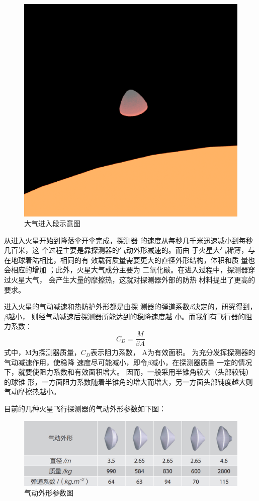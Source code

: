 \documentclass[UTF8,12pt]{ctexart}
\begin{document}
\begin{figure}[htb]
	\centering
	\includegraphics[width=0.5\linewidth]{大气进入过程.png}
	\caption{大气进入段示意图}
	\label{fig:pathdemo}	
\end{figure}
从进入火星开始到降落伞开伞完成，探测器
的速度从每秒几千米迅速减小到每秒几百米，这
个过程主要是靠探测器的气动外形减速的。而由
于火星大气稀薄，与在地球着陆相比，相同的有
效载荷质量需要更大的直径外形结构，体积和质
量也会相应的增加 ；此外，火星大气成分主要为
二氧化碳。在进入过程中，探测器穿过火星大气，
会产生大量的摩擦热，这就对探测器外部的防热
材料提出了更高的要求。

进入火星的气动减速和热防护外形都是由探
测器的弹道系数$\beta$决定的，研究得到， $\beta$越小，
则经气动减速后探测器所能达到的稳降速度越
小。而我们有飞行器的阻力系数：
\begin{equation}
	C_D=\frac{M}{\beta A}
\end{equation}
式中，M为探测器质量，$C_D$表示阻力系数，
A为有效面积。
为充分发挥探测器的气动减速作用，使稳降
速度尽可能减小，即令$\beta $减小，在探测器质量
一定的情况下，就要使阻力系数和有效面积增大。
因而，一般采用半锥角较大（头部较钝）的球锥
形，一方面阻力系数随着半锥角的增大而增大，另一方面头部钝度越大则气动摩擦热越小。


目前的几种火星飞行探测器的气动外形参数如下图：
\begin{figure}[htb]
	\centering
	\includegraphics[width=0.8\linewidth]{气动外形.png}
	\caption{气动外形参数图}
	\label{fig:pathdemo}	
\end{figure}
\end{document}
